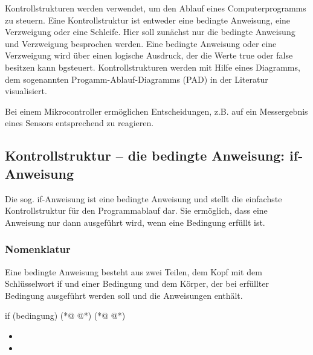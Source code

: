 \label{sec:Entscheidungen}

Kontrollstrukturen werden verwendet, um den Ablauf eines Computerprogramms zu steuern. Eine Kontrollstruktur ist entweder eine bedingte Anweisung, eine Verzweigung oder eine Schleife. Hier soll zunächst nur die bedingte Anweisung und Verzweigung besprochen werden. Eine bedingte Anweisung oder eine Verzweigung wird über einen logische Ausdruck, der die Werte true oder false besitzen kann  bgsteuert. Kontrollstrukturen werden mit Hilfe eines Diagramms, dem sogenannten Progamm-Ablauf-Diagramms (PAD) in der Literatur visualisiert.

Bei einem Mikrocontroller ermöglichen Entscheidungen, z.B. auf ein Messergebnis eines Sensors entsprechend zu reagieren. 

\subsection{Kontrollstruktur -- die bedingte Anweisung: if-Anweisung}\label{sec:bedingte-Anweisung}

Die sog. if-Anweisung ist eine bedingte Anweisung und stellt die einfachste Kontrollstruktur für den Programmablauf dar. Sie ermöglich, dass eine Anweisung nur dann ausgeführt wird, wenn eine Bedingung erfüllt ist.

\subsubsection{Nomenklatur}

Eine bedingte Anweisung besteht aus zwei Teilen, dem Kopf mit dem Schlüsselwort if und einer Bedingung und dem Körper, der bei erfüllter Bedingung ausgeführt werden soll und die Anweisungen enthält. 
\begin{multicols}{2}
\null\vfill 
\begin{arduinoCode}{}{}
if (bedingung) (*@  @*) 
{       
     (*@  @*)
} 
\end{arduinoCode}
\vfill\null 
\columnbreak

\null\vfill
\begin{itemize}
  \itemsep15pt
  
  \item[] 
  \item[] 
\end{itemize}
\vfill \null

\end{multicols}

